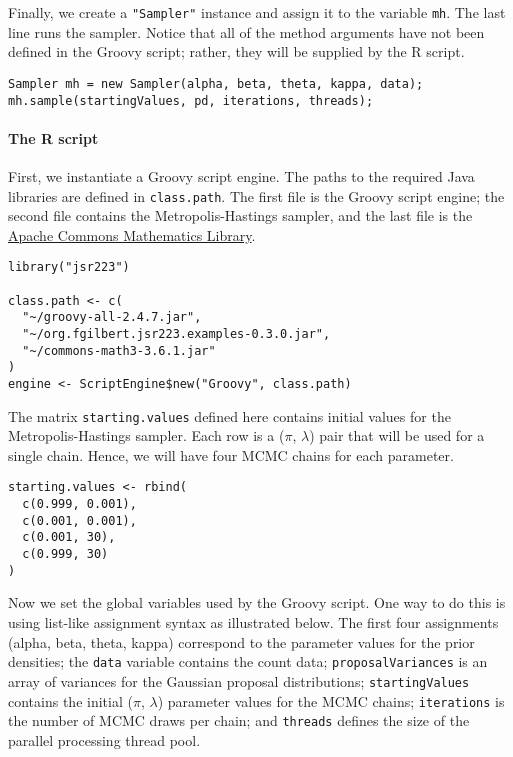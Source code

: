 \documentclass[
article,
11pt, %
a4paper, %
oneside, %
headinclude,footinclude, %
]{scrartcl}
\theoremstyle{definition} %
\theoremstyle{plain} %
\theoremstyle{remark} %
\newcommand{\code}[1]{\texttt{#1}}
\begin{document}
Finally, we create a \code{"Sampler"} instance and assign it to the variable \code{mh}. The last line runs the sampler. Notice that all of the method arguments have not been defined in the Groovy script; rather, they will be supplied by the R script.
\begin{verbatim}
Sampler mh = new Sampler(alpha, beta, theta, kappa, data);
mh.sample(startingValues, pd, iterations, threads);
\end{verbatim}

\paragraph{The R script} First, we instantiate a Groovy script engine. The paths to the required Java libraries are defined in \code{class.path}. The first file is the Groovy script engine; the second file contains the Metropolis-Hastings sampler, and the last file is the \href{http://commons.apache.org/proper/commons-math/}{Apache Commons Mathematics Library}.
\begin{verbatim}
library("jsr223")

class.path <- c(
  "~/groovy-all-2.4.7.jar",
  "~/org.fgilbert.jsr223.examples-0.3.0.jar",
  "~/commons-math3-3.6.1.jar"
)
engine <- ScriptEngine$new("Groovy", class.path)
\end{verbatim}

The matrix \code{starting.values} defined here contains initial values for the Metropolis-Hastings sampler. Each row is a ($\pi$, $\lambda$) pair that will be used for a single chain. Hence, we will have four MCMC chains for each parameter.

\begin{verbatim}
starting.values <- rbind(
  c(0.999, 0.001),
  c(0.001, 0.001),
  c(0.001, 30),
  c(0.999, 30)
)
\end{verbatim}

Now we set the global variables used by the Groovy script. One way to do this is using list-like assignment syntax as illustrated below. The first four assignments (alpha, beta, theta, kappa) correspond to the parameter values for the prior densities; the \code{data} variable contains the count data; \code{proposalVariances} is an array of variances for the Gaussian proposal distributions; \code{startingValues} contains the initial ($\pi$, $\lambda$) parameter values for the MCMC chains; \code{iterations} is the number of MCMC draws per chain; and \code{threads} defines the size of the parallel processing thread pool.
\end{document}
